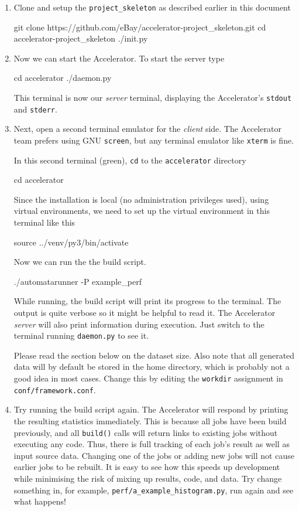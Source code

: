 \documentclass[a4paper]{article}
\begin{document}
\begin{enumerate}
\item Clone and setup the \texttt{project\_skeleton} as described
  earlier in this document
\begin{shell}
git clone https://github.com/eBay/accelerator-project_skeleton.git
cd accelerator-project_skeleton
./init.py
\end{shell}

\item Now we can start the Accelerator.  To start the server type
  \begin{shell}
cd accelerator
./daemon.py
  \end{shell}
  This terminal is now our \textsl{server} terminal, displaying the
  Accelerator's \texttt{stdout} and \texttt{stderr}.
  
\item Next, open a second terminal emulator for the \textsl{client}
  side.  The Accelerator team prefers using GNU \texttt{screen}, but any
  terminal emulator like \texttt{xterm} is fine.

  In this second terminal (green), \texttt{cd} to the
  \texttt{accelerator} directory
\begin{shell2}
cd accelerator
\end{shell2}
Since the installation is local (no administration privileges used),
using virtual environments, we need to set up the virtual environment
in this terminal like this
\begin{shell2}
source ../venv/py3/bin/activate
\end{shell2}
Now we can run the the build script.
\begin{shell2}
./automatarunner -P example_perf
\end{shell2}
While running, the build script will print its progress to the
terminal.  The output is quite verbose so it might be helpful to read
it.  The Accelerator \textsl{server} will also print information
during execution.  Just switch to the terminal running
\texttt{daemon.py} to see it.

Please read the section below on the dataset size.  Also note that all
generated data will by default be stored in the home directory, which
is probably not a good idea in most cases.  Change this by editing
the \texttt{workdir} assignment in \texttt{conf/framework.conf}.

\item Try running the build script again.  The Accelerator will
  respond by printing the resulting statistics immediately.  This is
  because all jobs have been build previously, and all
  \texttt{build()} calls will return links to existing jobs without
  executing any code.  Thus, there is full tracking of each job's
  result as well as input source data.  Changing one of the jobs or
  adding new jobs will not cause earlier jobs to be rebuilt.  It is
  easy to see how this speeds up development while minimising the risk
  of mixing up results, code, and data.  Try change something in, for
  example, \texttt{perf/a\_example\_histogram.py}, run again and see
  what happens!
\end{enumerate}
\end{document}
